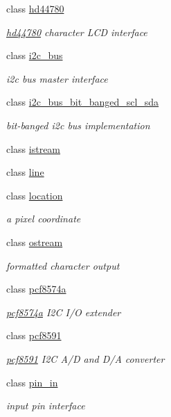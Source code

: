 \begin{DoxyCompactItemize}
class \hyperlink{classhwlib_1_1hd44780}{hd44780}
\begin{DoxyCompactList}\small\item\em \hyperlink{classhwlib_1_1hd44780}{hd44780} character L\+CD interface \end{DoxyCompactList}\item 
class \hyperlink{classhwlib_1_1i2c__bus}{i2c\+\_\+bus}
\begin{DoxyCompactList}\small\item\em i2c bus master interface \end{DoxyCompactList}\item 
class \hyperlink{classhwlib_1_1i2c__bus__bit__banged__scl__sda}{i2c\+\_\+bus\+\_\+bit\+\_\+banged\+\_\+scl\+\_\+sda}
\begin{DoxyCompactList}\small\item\em bit-\/banged i2c bus implementation \end{DoxyCompactList}\item 
class \hyperlink{classhwlib_1_1istream}{istream}
\item 
class \hyperlink{classhwlib_1_1line}{line}
\item 
class \hyperlink{classhwlib_1_1location}{location}
\begin{DoxyCompactList}\small\item\em a pixel coordinate \end{DoxyCompactList}\item 
class \hyperlink{classhwlib_1_1ostream}{ostream}
\begin{DoxyCompactList}\small\item\em formatted character output \end{DoxyCompactList}\item 
class \hyperlink{classhwlib_1_1pcf8574a}{pcf8574a}
\begin{DoxyCompactList}\small\item\em \hyperlink{classhwlib_1_1pcf8574a}{pcf8574a} I2C I/O extender \end{DoxyCompactList}\item 
class \hyperlink{classhwlib_1_1pcf8591}{pcf8591}
\begin{DoxyCompactList}\small\item\em \hyperlink{classhwlib_1_1pcf8591}{pcf8591} I2C A/D and D/A converter \end{DoxyCompactList}\item 
class \hyperlink{classhwlib_1_1pin__in}{pin\+\_\+in}
\begin{DoxyCompactList}\small\item\em input pin interface \end{DoxyCompactList}\item 

\end{DoxyCompactItemize}
